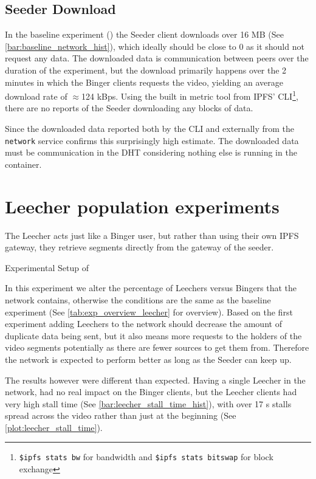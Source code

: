 \subsection{Seeder Download}
\label{sec:eval_seeder_rx}
In the baseline experiment () the Seeder client downloads over 16 \ac{MB} (See \autoref{bar:baseline_network_hist}), which ideally should be close to 0 as it should not request any data. The downloaded data is communication between peers over the duration of the experiment, but the download primarily happens over the 2 minutes in which the Binger clients requests the video, yielding an average download rate of $\approx$124 \ac{kBps}. Using the built in metric tool from \ac{IPFS}' \ac{CLI}\footnote{\texttt{\$ipfs stats bw} for bandwidth and \texttt{\$ipfs stats bitswap} for block exchange}, there are no reports of the Seeder downloading any blocks of data.

Since the downloaded data reported both by the \ac{CLI} and externally from the \texttt{network} service confirms this surprisingly high estimate. The downloaded data must be communication in the \acs{DHT} considering nothing else is running in the container.


\FloatBarrier \section{Leecher population experiments}
\label{sec:eval_leecher}
The Leecher acts just like a Binger user, but rather than using their own \ac{IPFS} gateway, they retrieve segments directly from the gateway of the seeder.

\begin{table}[!htbp]
\myfloatalign
\caption[Experimental Setup of Leecher]{Experimental Setup of }
\label{tab:exp_overview_leecher}

\end{table}

In this experiment we alter the percentage of Leechers versus Bingers that the network contains, otherwise the conditions are the same as the baseline experiment (See \autoref{tab:exp_overview_leecher} for overview).
Based on the first experiment adding Leechers to the network should decrease the amount of duplicate data being sent, but it also means more requests to the holders of the video segments potentially as there are fewer sources to get them from. Therefore the network is expected to perform better as long as the Seeder can keep up.

The results however were different than expected. Having a single Leecher in the network, had no real impact on the Binger clients, but the Leecher clients had very high stall time (See \autoref{bar:leecher_stall_time_hist}), with over 17 \ac{s} stalls spread across the video rather than just at the beginning (See \autoref{plot:leecher_stall_time}). 

